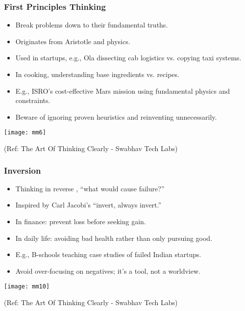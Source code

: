 \begin{frame}[fragile]\frametitle{First Principles Thinking}
  \begin{itemize}
    \item Break problems down to their fundamental truths.
    \item Originates from Aristotle and physics.
    \item Used in startups, e.g., Ola dissecting cab logistics vs. copying taxi systems.
    \item In cooking, understanding base ingredients vs. recipes.
    \item E.g., ISRO's cost-effective Mars mission using fundamental physics and constraints.
    \item Beware of ignoring proven heuristics and reinventing unnecessarily.
  \end{itemize}
  
	\begin{center}
	\texttt{[image: mm6]}
	\end{center}
	
{\tiny (Ref: The Art Of Thinking Clearly - Swabhav Tech Labs)}      
\end{frame}

\begin{frame}[fragile]\frametitle{Inversion}
  \begin{itemize}
    \item Thinking in reverse , ``what would cause failure?''
    \item Inspired by Carl Jacobi's ``invert, always invert.''
    \item In finance: prevent loss before seeking gain.
    \item In daily life: avoiding bad health rather than only pursuing good.
    \item E.g., B-schools teaching case studies of failed Indian startups.
    \item Avoid over-focusing on negatives; it's a tool, not a worldview.
  \end{itemize}
  
	\begin{center}
	\texttt{[image: mm10]}
	\end{center}
	
{\tiny (Ref: The Art Of Thinking Clearly - Swabhav Tech Labs)}    
\end{frame}

